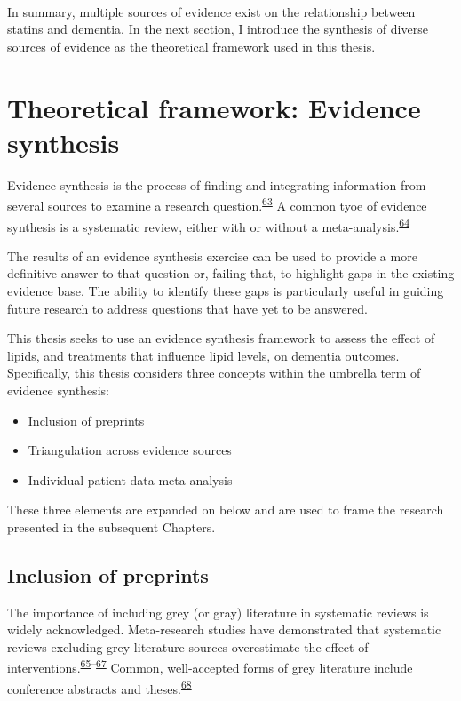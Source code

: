 \documentclass[a4paper, twoside]{templates/ociamthesis}
\providecommand{\tightlist}{%
  \setlength{\itemsep}{0pt}\setlength{\parskip}{0pt}}
\begin{document}
~

In summary, multiple sources of evidence exist on the relationship between statins and dementia. In the next section, I introduce the synthesis of diverse sources of evidence as the theoretical framework used in this thesis.

\hypertarget{theoretical-framework-evidence-synthesis}{%
\section{Theoretical framework: Evidence synthesis}\label{theoretical-framework-evidence-synthesis}}

Evidence synthesis is the process of finding and integrating information from several sources to examine a research question.\textsuperscript{\protect\hyperlink{ref-donnelly2018a}{63}} A common tyoe of evidence synthesis is a systematic review, either with or without a meta-analysis.\textsuperscript{\protect\hyperlink{ref-chandler2019chapter}{64}}

The results of an evidence synthesis exercise can be used to provide a more definitive answer to that question or, failing that, to highlight gaps in the existing evidence base. The ability to identify these gaps is particularly useful in guiding future research to address questions that have yet to be answered.

This thesis seeks to use an evidence synthesis framework to assess the effect of lipids, and treatments that influence lipid levels, on dementia outcomes.
Specifically, this thesis considers three concepts within the umbrella term of evidence synthesis:

\begin{itemize}
\tightlist
\item
  Inclusion of preprints
\item
  Triangulation across evidence sources
\item
  Individual patient data meta-analysis
\end{itemize}

These three elements are expanded on below and are used to frame the research presented in the subsequent Chapters.

\hypertarget{diverse-sources-preprints}{%
\subsection{Inclusion of preprints}\label{diverse-sources-preprints}}

The importance of including grey (or gray) literature in systematic reviews is widely acknowledged. Meta-research studies have demonstrated that systematic reviews excluding grey literature sources overestimate the effect of interventions.\textsuperscript{\protect\hyperlink{ref-conn2003}{65}--\protect\hyperlink{ref-hopewell2007}{67}} Common, well-accepted forms of grey literature include conference abstracts and theses.\textsuperscript{\protect\hyperlink{ref-lefebvre2019searching}{68}}
\end{document}
